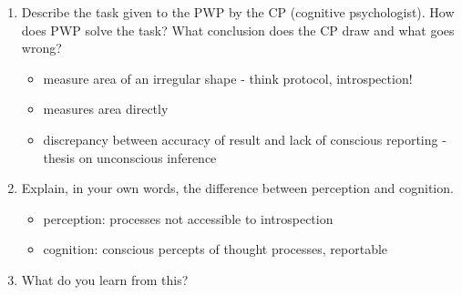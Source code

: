 \documentclass[12pt,english]{scrartcl}
\begin{document}
\begin{enumerate}
 \item Describe the task given to the PWP by the CP (cognitive  psychologist). How does PWP solve the task? What conclusion does the CP draw and what goes wrong?
  \begin{itemize}
   \color{blue} 
   \item measure area of an irregular shape - think protocol, introspection!
   \item measures area directly
   \item discrepancy between accuracy of result and lack of conscious reporting - thesis on unconscious inference
  \end{itemize}
 
 \item Explain, in your own words, the difference between perception and cognition.
  \begin{itemize}
   \color{blue} 
   \item perception: processes not accessible to introspection
   \item cognition: conscious percepts of thought processes, reportable
  \end{itemize}

 \item What do you learn from this?

\end{enumerate}
\end{document}
